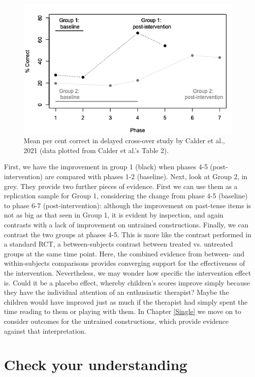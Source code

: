 \documentclass{krantz}
\begin{document}
\begin{figure}
\includegraphics[width=0.75\linewidth]{images_bw/calderfig-1} \caption{Mean per cent correct in delayed cross-over study by Calder et al., 2021 (data plotted from Calder et al.'s Table 2).}\label{fig:calderfig}
\end{figure}

First, we have the improvement in group 1 (black) when phases 4-5 (post-intervention) are compared with phases 1-2 (baseline). Next, look at Group 2, in grey. They provide two further pieces of evidence. First we can use them as a replication sample for Group 1, considering the change from phase 4-5 (baseline) to phase 6-7 (post-intervention): although the improvement on past-tense items is not as big as that seen in Group 1, it is evident by inspection, and again contrasts with a lack of improvement on untrained constructions. Finally, we can contrast the two groups at phases 4-5. This is more like the contrast performed in a standard RCT, a between-subjects contrast between treated vs. untreated groups at the same time point. Here, the combined evidence from between- and within-subjects comparisons provides converging support for the effectiveness of the intervention. Nevertheless, we may wonder how specific the intervention effect is. Could it be a placebo effect, whereby children's scores improve simply because they have the individual attention of an enthusiastic therapist? Maybe the children would have improved just as much if the therapist had simply spent the time reading to them or playing with them. In Chapter \ref{Single} we move on to consider outcomes for the untrained constructions, which provide evidence against that interpretation.

\hypertarget{check-your-understanding-18}{%
\section{Check your understanding}\label{check-your-understanding-18}}
\end{document}
